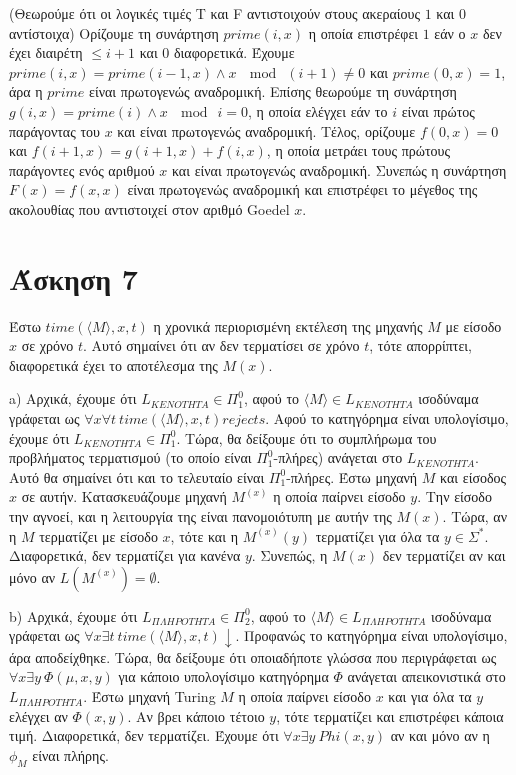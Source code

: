 \documentclass[a4paper, oneside, 11pt]{article}
\theoremstyle{definition}
\begin{document}
(Θεωρούμε ότι οι λογικές τιμές T και F αντιστοιχούν στους ακεραίους $1$ και $0$ αντίστοιχα)
Ορίζουμε τη συνάρτηση $prime(i,x)$ η οποία επιστρέφει $1$ εάν ο $x$ δεν έχει διαιρέτη $\leq i+1$ και $0$ διαφορετικά.
Έχουμε $prime(i,x)=prime(i-1,x)\land x\ \mod\ (i+1)\neq 0$ και $prime(0,x)=1$, άρα η $prime$ είναι πρωτογενώς αναδρομική.
Επίσης θεωρούμε τη συνάρτηση $g(i,x)=prime(i)\land x\ \mod\ i=0$, η οποία ελέγχει εάν το $i$ είναι πρώτος παράγοντας του $x$ και
είναι πρωτογενώς αναδρομική. Τέλος, ορίζουμε $f(0,x)=0$ και $f(i+1,x)=g(i+1,x) + f(i,x)$, η οποία μετράει τους πρώτους παράγοντες
ενός αριθμού $x$ και είναι πρωτογενώς αναδρομική. Συνεπώς η συνάρτηση $F(x)=f(x,x)$ είναι πρωτογενώς αναδρομική και επιστρέφει
το μέγεθος της ακολουθίας που αντιστοιχεί στον αριθμό Goedel $x$.

\section*{Άσκηση 7}
Έστω $time(\langle M\rangle, x, t)$ η χρονικά περιορισμένη εκτέλεση της μηχανής $M$ με είσοδο $x$ σε χρόνο $t$. Αυτό σημαίνει ότι αν δεν τερματίσει σε χρόνο $t$, τότε απορρίπτει,
διαφορετικά έχει το αποτέλεσμα της $M(x)$.

a) Αρχικά, έχουμε ότι $L_{KENOTHTA}\in \Pi_1^0$, αφού το $\langle M\rangle\in L_{KENOTHTA}$ ισοδύναμα γράφεται ως $\forall x\forall t\ time(\langle M\rangle,x,t) rejects$. 
Αφού το κατηγόρημα είναι υπολογίσιμο, έχουμε ότι $L_{KENOTHTA}\in \Pi_1^0$.
Τώρα, θα δείξουμε ότι το συμπλήρωμα του προβλήματος τερματισμού (το οποίο είναι $\Pi_1^0$-πλήρες) ανάγεται στο $L_{KENOTHTA}$. Αυτό θα σημαίνει ότι και το τελευταίο είναι 
$\Pi_1^0$-πλήρες. Έστω μηχανή $M$ και είσοδος $x$ σε αυτήν. Κατασκευάζουμε μηχανή $M^{(x)}$ η οποία παίρνει είσοδο $y$. Την είσοδο την αγνοεί, και η λειτουργία της είναι
πανομοιότυπη με αυτήν της $M(x)$. Τώρα, αν η $M$ τερματίζει με είσοδο $x$, 
τότε και η $M^{(x)}(y)$ τερματίζει για όλα τα $y\in\Sigma^*$. Διαφορετικά, δεν τερματίζει για κανένα $y$.
Συνεπώς, η $M(x)$ δεν τερματίζει αν και μόνο αν $L(M^{(x)})=\emptyset$.

b) Αρχικά, έχουμε ότι $L_{\Pi\Lambda HPOTHTA}\in \Pi_2^0$, αφού το $\langle M\rangle\in L_{\Pi\Lambda HPOTHTA}$ ισοδύναμα γράφεται ως
$\forall x\exists t\ time(\langle M\rangle, x,t)\downarrow$. Προφανώς το κατηγόρημα είναι υπολογίσιμο, άρα αποδείχθηκε.
Τώρα, θα δείξουμε ότι οποιαδήποτε γλώσσα που περιγράφεται ως $\forall x\exists y\ \Phi (\mu, x,y)$ για κάποιο υπολογίσιμο κατηγόρημα $\Phi$ ανάγεται απεικονιστικά στο
$L_{\Pi\Lambda HPOTHTA}$.
Έστω μηχανή Turing $M$ η οποία παίρνει είσοδο $x$ και για όλα τα $y$ ελέγχει αν $\Phi(x,y)$. Αν βρει κάποιο τέτοιο $y$, τότε τερματίζει και επιστρέφει κάποια τιμή.
Διαφορετικά, δεν τερματίζει. Έχουμε ότι $\forall x\exists y\ Phi(x,y)$ αν και μόνο αν η $\phi_M$ είναι πλήρης.
\end{document}
